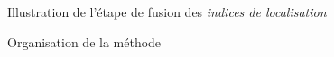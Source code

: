 \begin{figure}
  \centering
  
  \caption{Illustration de l'étape de fusion des \emph{indices de
      localisation}}
  \label{fig:ex_fus_inf}
\end{figure}

\begin{landscape}
  \begin{figure}[H]
    \centering
    
    \caption{Organisation de la méthode}
    \label{fig:methodo_1}
  \end{figure}
\end{landscape}


